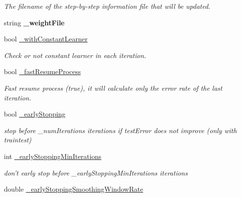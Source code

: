 \begin{DoxyCompactItemize}
\begin{DoxyCompactList}\small\item\em The filename of the step-\/by-\/step information file that will be updated. \end{DoxyCompactList}\item 
\hypertarget{classMultiBoost_1_1AdaBoostMHLearner_a8aae9fe5cd389062806ad713213eabc0}{string {\bfseries \-\_\-weight\-File}}\label{classMultiBoost_1_1AdaBoostMHLearner_a8aae9fe5cd389062806ad713213eabc0}

\item 
\hypertarget{classMultiBoost_1_1AdaBoostMHLearner_a48e5f2dfd1da6b43bcc0224fc341cc5b}{bool \hyperlink{classMultiBoost_1_1AdaBoostMHLearner_a48e5f2dfd1da6b43bcc0224fc341cc5b}{\-\_\-with\-Constant\-Learner}}\label{classMultiBoost_1_1AdaBoostMHLearner_a48e5f2dfd1da6b43bcc0224fc341cc5b}

\begin{DoxyCompactList}\small\item\em Check or not constant learner in each iteration. \end{DoxyCompactList}\item 
\hypertarget{classMultiBoost_1_1AdaBoostMHLearner_ae2f32a7b1285c02cdcb1c2d19a2d6b5a}{bool \hyperlink{classMultiBoost_1_1AdaBoostMHLearner_ae2f32a7b1285c02cdcb1c2d19a2d6b5a}{\-\_\-fast\-Resume\-Process}}\label{classMultiBoost_1_1AdaBoostMHLearner_ae2f32a7b1285c02cdcb1c2d19a2d6b5a}

\begin{DoxyCompactList}\small\item\em Fast resume process (true), it will calculate only the error rate of the last iteration. \end{DoxyCompactList}\item 
bool \hyperlink{classMultiBoost_1_1AdaBoostMHLearner_aec9596ab86f3071c4dc0acb3729227ee}{\-\_\-early\-Stopping}
\begin{DoxyCompactList}\small\item\em stop before \-\_\-num\-Iterations iterations if test\-Error does not improve (only with traintest) \end{DoxyCompactList}\item 
\hypertarget{classMultiBoost_1_1AdaBoostMHLearner_a504a1882f72446d399cafc9659f5cd8c}{int \hyperlink{classMultiBoost_1_1AdaBoostMHLearner_a504a1882f72446d399cafc9659f5cd8c}{\-\_\-early\-Stopping\-Min\-Iterations}}\label{classMultiBoost_1_1AdaBoostMHLearner_a504a1882f72446d399cafc9659f5cd8c}

\begin{DoxyCompactList}\small\item\em don't early stop before \-\_\-early\-Stopping\-Min\-Iterations iterations \end{DoxyCompactList}\item 
\hypertarget{classMultiBoost_1_1AdaBoostMHLearner_a78e937859e7dac27fa1cc50351e95437}{double \hyperlink{classMultiBoost_1_1AdaBoostMHLearner_a78e937859e7dac27fa1cc50351e95437}{\-\_\-early\-Stopping\-Smoothing\-Window\-Rate}}\label{classMultiBoost_1_1AdaBoostMHLearner_a78e937859e7dac27fa1cc50351e95437}


\end{DoxyCompactItemize}
